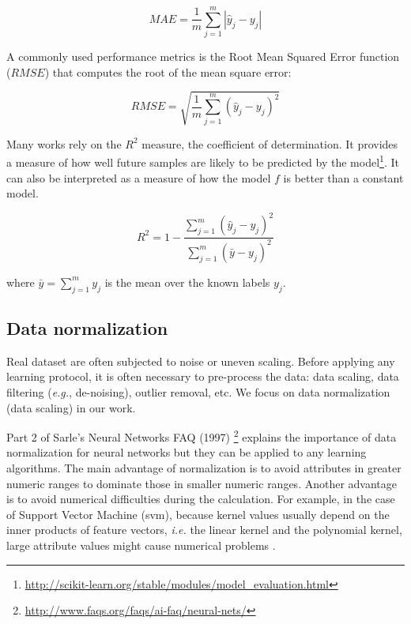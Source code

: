 \begin{equation}
MAE = \frac{1}{m} \sum_{j=1}^m|\hat{y}_j-y_j|
\end{equation}

A commonly used performance metrics is the Root Mean Squared Error function ($RMSE$) that computes the root of the mean square error: 

\begin{equation}
RMSE = \sqrt{\frac{1}{m} \sum_{j=1}^m(\hat{y}_j-y_j)^2}
\end{equation}

Many works rely on the $R^2$ measure, the coefficient of determination. It provides a measure of how well future samples are likely to be predicted by the model\footnote{\url{http://scikit-learn.org/stable/modules/model_evaluation.html}}. It can also be interpreted as a measure of how the model $f$ is better than a constant model. 

\begin{equation}
R^2 = 1- \frac{\sum_{j=1}^m (\hat{y}_j-y_j)^2}{\sum_{j=1}^m (\bar{y}-y_j)^2}
\end{equation}

\noindent where $\bar{y} = \sum_{j=1}^m y_j$ is the mean over the known labels $y_j$.


\subsection{Data normalization}
\label{sec:data_normalization}
Real dataset are often subjected to noise or uneven scaling. Before applying any learning protocol, it is often necessary to pre-process the data: data scaling, data filtering (\textit{e.g.}, de-noising), outlier removal, etc. We focus on data normalization (data scaling) in our work.

Part 2 of Sarle's Neural Networks FAQ (1997) \footnote{\url{http://www.faqs.org/faqs/ai-faq/neural-nets/}} explains the importance of data normalization for neural networks but they can be applied to any learning algorithms. The main advantage of normalization is to avoid attributes in greater numeric ranges to dominate those in smaller numeric ranges. Another advantage is to avoid numerical difficulties during the calculation. For example, in the case of Support Vector Machine ({\sc svm}), because kernel values usually depend on the inner products of feature vectors, \textit{i.e.} the linear kernel and the polynomial kernel, large attribute values might cause numerical problems \cite{Hsu2008}. 

